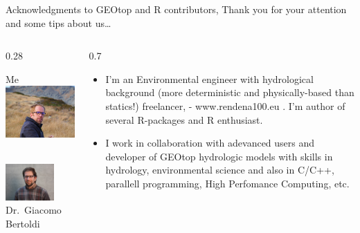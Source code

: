 \documentclass[
  ignorenonframetext,
]{beamer}
\def\begincols{\begin{columns}}
\def\begincol{\begin{column}}
\def\endcol{\end{column}}
\def\endcols{\end{columns}}
\begin{document}
\begin{frame}{Acknowledgments to GEOtop and R contributors, Thank you
for your attention and some tips about us\ldots{}}
\protect\hypertarget{acknowledgments-to-geotop-and-r-contributors-thank-you-for-your-attention-and-some-tips-about-us}{}
\begincols

\begincol{0.28\textwidth}

Me
\includegraphics[width=1\textwidth,height=\textheight]{resources/images/emanuele.jpg}~

\includegraphics[width=0.7\textwidth,height=\textheight]{resources/images/giacomo.jpg}\\
Dr.~Giacomo Bertoldi \endcol

\begincol{0.7\textwidth}

\begin{itemize}
\item
  I'm an Environmental engineer with hydrological background (more
  deterministic and physically-based than statics!) freelancer, -
  www.rendena100.eu . I'm author of several R-packages and R enthusiast.
\item
  I work in collaboration with adevanced users and developer of GEOtop
  hydrologic models with skills in hydrology, environmental science and
  also in C/C++, parallell programming, High Perfomance Computing, etc.
\end{itemize}

\endcol

\endcols
\end{frame}
\end{document}
